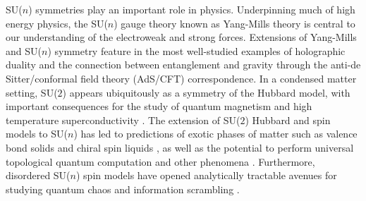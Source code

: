 \documentclass[aps,pra,nofootinbib,twocolumn,superscriptaddress]{revtex4-2}
\newcommand{\1}{\mathds{1}}
\begin{document}
SU($n$) symmetries play an important role in physics.
Underpinning much of high energy physics, the SU($n$) gauge theory known as Yang-Mills theory is central to our understanding of the electroweak and strong forces.
Extensions of Yang-Mills and SU($n$) symmetry feature in the most well-studied examples of holographic duality \cite{maldacena1999largen} and the connection between entanglement and gravity \cite{ryu2006holographic} through the anti-de Sitter/conformal field theory (AdS/CFT) correspondence.
In a condensed matter setting, SU($2$) appears ubiquitously as a symmetry of the Hubbard model, with important consequences for the study of quantum magnetism and high temperature superconductivity \cite{lee2006doping}.
The extension of SU($2$) Hubbard and spin models to SU($n$) has led to predictions of exotic phases of matter such as valence bond solids \cite{read1989valencebond, rokhsar1990quadratic, kaul2012lattice, hermele2011topological} and chiral spin liquids \cite{hermele2009mott, hermele2011topological, chen2016syntheticgaugefield, nataf2016chiral}, as well as the potential to perform universal topological quantum computation \cite{freedman2004class, nayak2008nonabelian} and other phenomena \cite{nataf2014exact, nataf2016exact}.
Furthermore, disordered SU($n$) spin models have opened analytically tractable avenues for studying quantum chaos and information scrambling \cite{sachdev1993gapless, bentsen2019integrable}.
\end{document}
